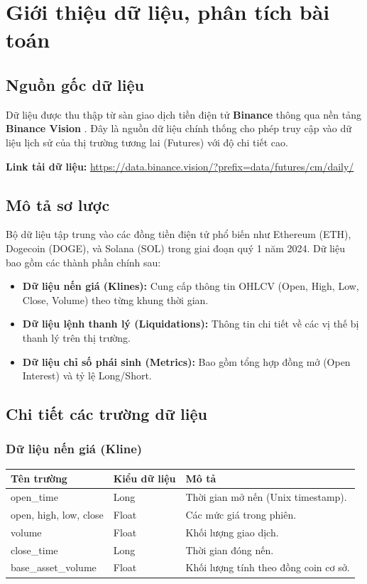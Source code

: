 \section{Giới thiệu dữ liệu, phân tích bài toán}

\subsection{Nguồn gốc dữ liệu}
Dữ liệu được thu thập từ sàn giao dịch tiền điện tử \textbf{Binance} thông qua nền tảng \textbf{Binance Vision} \cite{binancevision_futures_data}. Đây là nguồn dữ liệu chính thống cho phép truy cập vào dữ liệu lịch sử của thị trường tương lai (Futures) với độ chi tiết cao.

\textbf{Link tải dữ liệu:} \url{https://data.binance.vision/?prefix=data/futures/cm/daily/}

\subsection{Mô tả sơ lược}
Bộ dữ liệu tập trung vào các đồng tiền điện tử phổ biến như Ethereum (ETH), Dogecoin (DOGE), và Solana (SOL) trong giai đoạn quý 1 năm 2024. Dữ liệu bao gồm các thành phần chính sau:

\begin{itemize}
    \item \textbf{Dữ liệu nến giá (Klines):} Cung cấp thông tin OHLCV (Open, High, Low, Close, Volume) theo từng khung thời gian.
    \item \textbf{Dữ liệu lệnh thanh lý (Liquidations):} Thông tin chi tiết về các vị thế bị thanh lý trên thị trường.
    \item \textbf{Dữ liệu chỉ số phái sinh (Metrics):} Bao gồm tổng hợp đồng mở (Open Interest) và tỷ lệ Long/Short.
\end{itemize}

\subsection{Chi tiết các trường dữ liệu}

\subsubsection{Dữ liệu nến giá (Kline) \cite{binance_klines}}
\begin{table}[H]
\centering
\begin{tabular}{|l|l|l|}
\hline
\textbf{Tên trường} & \textbf{Kiểu dữ liệu} & \textbf{Mô tả} \\ \hline
open\_time & Long & Thời gian mở nến (Unix timestamp). \\ \hline
open, high, low, close & Float & Các mức giá trong phiên. \\ \hline
volume & Float & Khối lượng giao dịch. \\ \hline
close\_time & Long & Thời gian đóng nến. \\ \hline
base\_asset\_volume & Float & Khối lượng tính theo đồng coin cơ sở. \\ \hline
\end{tabular}
\end{table}

